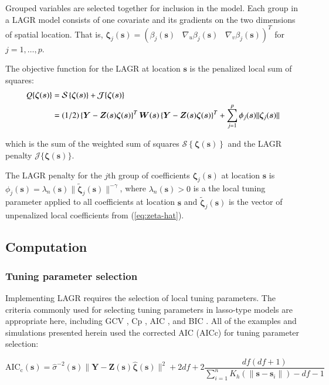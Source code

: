 \documentclass[authoryear, review, 11pt]{elsarticle}
\begin{document}
    Grouped variables are selected together for inclusion in the model. Each group in a LAGR model consists of one covariate and its gradients on the two dimensions of spatial location. That is, $\bm{\zeta}_j(\bm{s}) = \left( \beta_j(\bm{s}) \;\;\; \nabla_u \beta_j(\bm{s}) \;\;\; \nabla_v \beta_j(\bm{s}) \right)^T$ for $j=1, \dots, p$.
	
	The objective function for the LAGR at location $\bm{s}$ is the penalized local sum of squares:
	\begin{align}\label{eq:adaptive-lasso-WLS}
		Q \{ \bm{\zeta}(\bm{s}) \} &= \mathcal{S} \left\{ \bm{\zeta}( \bm{s} ) \right\} + \mathcal{J}\{ \bm{\zeta}(\bm{s}) \} \notag \\
		&= (1/2) \left\{ \bm{Y} - \bm{Z}(\bm{s}) \bm{\zeta} (\bm{s}) \right\}^T \bm{W}(\bm{s}) \left\{ \bm{Y} - \bm{Z}(\bm{s}) \bm{\zeta} (\bm{s}) \right\}^T + \sum_{j=1}^p \phi_j(\bm{s}) \| \bm{\zeta}_j(\bm{s}) \| 
	\end{align}
	
	which is the sum of the weighted sum of squares $\mathcal{S} \left\{ \bm{\zeta}( \bm{s} ) \right\}$ and the LAGR penalty $\mathcal{J}\{ \bm{\zeta}(\bm{s}) \}$.

    The LAGR penalty for the $j$th group of coefficients $\bm{\zeta}_j(\bm{s})$ at location $\bm{s}$ is $\phi_j(\bm{s}) = \lambda_n (\bm{s}) \| \tilde{\bm{\zeta}}_j(\bm{s}) \|^{-\gamma}$, where $\lambda_n (\bm{s}) > 0$ is a the local tuning parameter applied to all coefficients at location $\bm{s}$ and $\tilde{\bm{\zeta}}_j (\bm{s})$ is the vector of unpenalized local coefficients from (\ref{eq:zeta-hat}).


    \subsection{Computation}
        \subsubsection{Tuning parameter selection}
        Implementing LAGR requires the selection of local tuning parameters. The criteria commonly used for selecting tuning parameters in lasso-type models are appropriate here, including GCV \citep{Wahba:1990}, Cp \citep{Mallows-1973}, AIC \citep{Akaike-1973}, and BIC \citep{Schwarz-1978}. All of the examples and simulations presented herein used the corrected AIC (AICc) \citep{Hurvich-1998} for tuning parameter selection:

        \begin{equation}
            \text{AIC}_{\text{c}}(\bm{s}) = \hat{\sigma}^{-2}(\bm{s}) \|\bm{Y} - \bm{Z}(\bm{s}) \hat{\bm{\zeta}}(\bm{s}) \|^2 + 2df + 2\frac{df (df+1)}{\sum_{i=1}^n K_h(\| \bm{s} - \bm{s}_i \|)-df-1}
        \end{equation}
\end{document}
